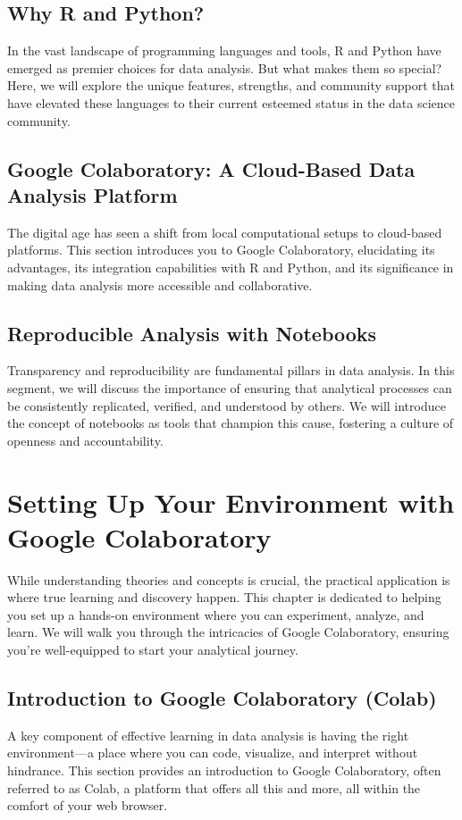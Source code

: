 \documentclass[a4paper,12pt]{book}
\begin{document}
\section{Why R and Python?}
In the vast landscape of programming languages and tools, R and Python have emerged as premier choices for data analysis. But what makes them so special? Here, we will explore the unique features, strengths, and community support that have elevated these languages to their current esteemed status in the data science community.

\section{Google Colaboratory: A Cloud-Based Data Analysis Platform}
The digital age has seen a shift from local computational setups to cloud-based platforms. This section introduces you to Google Colaboratory, elucidating its advantages, its integration capabilities with R and Python, and its significance in making data analysis more accessible and collaborative.

\section{Reproducible Analysis with Notebooks}
Transparency and reproducibility are fundamental pillars in data analysis. In this segment, we will discuss the importance of ensuring that analytical processes can be consistently replicated, verified, and understood by others. We will introduce the concept of notebooks as tools that champion this cause, fostering a culture of openness and accountability.

\chapter{Setting Up Your Environment with Google Colaboratory}
While understanding theories and concepts is crucial, the practical application is where true learning and discovery happen. This chapter is dedicated to helping you set up a hands-on environment where you can experiment, analyze, and learn. We will walk you through the intricacies of Google Colaboratory, ensuring you're well-equipped to start your analytical journey.

\section{Introduction to Google Colaboratory (Colab)}
A key component of effective learning in data analysis is having the right environment—a place where you can code, visualize, and interpret without hindrance. This section provides an introduction to Google Colaboratory, often referred to as Colab, a platform that offers all this and more, all within the comfort of your web browser.
\end{document}
